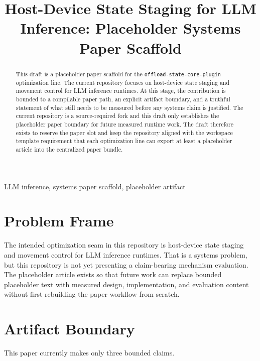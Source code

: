 \documentclass[conference]{IEEEtran}
\begin{document}
\title{Host-Device State Staging for LLM Inference: Placeholder Systems Paper Scaffold}

\author{}

\maketitle

\begin{abstract}
This draft is a placeholder paper scaffold for the \texttt{offload-state-core-plugin} optimization line. The current repository focuses on host-device state staging and movement control for LLM inference runtimes. At this stage, the contribution is bounded to a compilable paper path, an explicit artifact boundary, and a truthful statement of what still needs to be measured before any systems claim is justified. The current repository is a source-required fork and this draft only establishes the placeholder paper boundary for future measured runtime work. The draft therefore exists to reserve the paper slot and keep the repository aligned with the workspace template requirement that each optimization line can export at least a placeholder article into the centralized paper bundle.
\end{abstract}

\begin{IEEEkeywords}
LLM inference, systems paper scaffold, placeholder artifact
\end{IEEEkeywords}

\section{Problem Frame}

The intended optimization seam in this repository is host-device state staging and movement control for LLM inference runtimes. That is a systems problem, but this repository is not yet presenting a claim-bearing mechanism evaluation. The placeholder article exists so that future work can replace bounded placeholder text with measured design, implementation, and evaluation content without first rebuilding the paper workflow from scratch.

\section{Artifact Boundary}

This paper currently makes only three bounded claims.
\end{document}
